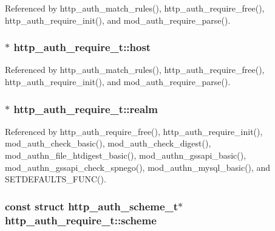 Referenced by http\-\_\-auth\-\_\-match\-\_\-rules(), http\-\_\-auth\-\_\-require\-\_\-free(), http\-\_\-auth\-\_\-require\-\_\-init(), and mod\-\_\-auth\-\_\-require\-\_\-parse().

\hypertarget{structhttp__auth__require__t_a9ce819a42f5767702d67b60ca5f94925}{
\subsubsection[{host}]{$\ast$ http\-\_\-auth\-\_\-require\-\_\-t\-::host}}\label{structhttp__auth__require__t_a9ce819a42f5767702d67b60ca5f94925}


Referenced by http\-\_\-auth\-\_\-match\-\_\-rules(), http\-\_\-auth\-\_\-require\-\_\-free(), http\-\_\-auth\-\_\-require\-\_\-init(), and mod\-\_\-auth\-\_\-require\-\_\-parse().

\hypertarget{structhttp__auth__require__t_aa16fcd03a3089dff8de91e1c3b9ea05e}{
\subsubsection[{realm}]{$\ast$ http\-\_\-auth\-\_\-require\-\_\-t\-::realm}}\label{structhttp__auth__require__t_aa16fcd03a3089dff8de91e1c3b9ea05e}


Referenced by http\-\_\-auth\-\_\-require\-\_\-free(), http\-\_\-auth\-\_\-require\-\_\-init(), mod\-\_\-auth\-\_\-check\-\_\-basic(), mod\-\_\-auth\-\_\-check\-\_\-digest(), mod\-\_\-authn\-\_\-file\-\_\-htdigest\-\_\-basic(), mod\-\_\-authn\-\_\-gssapi\-\_\-basic(), mod\-\_\-authn\-\_\-gssapi\-\_\-check\-\_\-spnego(), mod\-\_\-authn\-\_\-mysql\-\_\-basic(), and S\-E\-T\-D\-E\-F\-A\-U\-L\-T\-S\-\_\-\-F\-U\-N\-C().

\hypertarget{structhttp__auth__require__t_a954a85447f059f76d25965b0f245d828}{
\subsubsection[{scheme}]{\setlength{\rightskip}{0pt plus 5cm}const struct {\bf http\-\_\-auth\-\_\-scheme\-\_\-t}$\ast$ http\-\_\-auth\-\_\-require\-\_\-t\-::scheme}}\label{structhttp__auth__require__t_a954a85447f059f76d25965b0f245d828}


